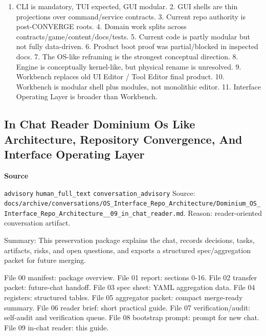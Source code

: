 \documentclass[9pt,a4paper,openany]{book}
\newcommand{\vonecallout}[3]{\par\medskip\noindent\begingroup\setlength{\fboxsep}{7pt}\colorbox{DomCalloutBg}{\parbox{0.94\linewidth}{\textbf{\textcolor{#1}{#2}}\par #3}}\endgroup\par\medskip}
\begin{document}
\begin{enumerate}
\item CLI is mandatory, TUI expected, GUI modular.\allowbreak{} 2.\allowbreak{} GUI shells are thin projections over command/\allowbreak{}service contracts.\allowbreak{} 3.\allowbreak{} Current repo authority is post-\allowbreak{}CONVERGE roots.\allowbreak{} 4.\allowbreak{} Domain work splits across contracts/\allowbreak{}game/\allowbreak{}content/\allowbreak{}docs/\allowbreak{}tests.\allowbreak{} 5.\allowbreak{} Current code is partly modular but not fully data-\allowbreak{}driven.\allowbreak{} 6.\allowbreak{} Product boot proof was partial/\allowbreak{}blocked in inspected docs.\allowbreak{} 7.\allowbreak{} The OS-\allowbreak{}like reframing is the strongest conceptual direction.\allowbreak{} 8.\allowbreak{} Engine is conceptually kernel-\allowbreak{}like, but physical rename is unresolved.\allowbreak{} 9.\allowbreak{} Workbench replaces old UI Editor /\allowbreak{} Tool Editor final product.\allowbreak{} 10.\allowbreak{} Workbench is modular shell plus modules, not monolithic editor.\allowbreak{} 11.\allowbreak{} Interface Operating Layer is broader than Workbench.\allowbreak{}
\end{enumerate}


\subsection{In Chat Reader Dominium Os Like Architecture, Repository Convergence, And Interface Operating Layer}

\vonecallout{DomSlate}{Source}{\texttt{advisory} \texttt{human\_\allowbreak{}full\_\allowbreak{}text} \texttt{conversation\_\allowbreak{}advisory} Source: \texttt{docs/\allowbreak{}archive/\allowbreak{}conversations/\allowbreak{}OS\_\allowbreak{}Interface\_\allowbreak{}Repo\_\allowbreak{}Architecture/\allowbreak{}Dominium\_\allowbreak{}OS\_\allowbreak{}Interface\_\allowbreak{}Repo\_\allowbreak{}Architecture\_\allowbreak{}\_\allowbreak{}09\_\allowbreak{}in\_\allowbreak{}chat\_\allowbreak{}reader.\allowbreak{}md}.\allowbreak{} Reason: reader-\allowbreak{}oriented conversation artifact.\allowbreak{}}

Summary: This preservation package explains the chat, records decisions, tasks, artifacts, risks, and open questions, and exports a structured spec/\allowbreak{}aggregation packet for future merging.\allowbreak{}


File 00 manifest: package overview.\allowbreak{} File 01 report: sections 0-\allowbreak{}16.\allowbreak{} File 02 transfer packet: future-\allowbreak{}chat handoff.\allowbreak{} File 03 spec sheet: YAML aggregation data.\allowbreak{} File 04 registers: structured tables.\allowbreak{} File 05 aggregator packet: compact merge-\allowbreak{}ready summary.\allowbreak{} File 06 reader brief: short practical guide.\allowbreak{} File 07 verification/\allowbreak{}audit: self-\allowbreak{}audit and verification queue.\allowbreak{} File 08 bootstrap prompt: prompt for new chat.\allowbreak{} File 09 in-\allowbreak{}chat reader: this guide.\allowbreak{}
\end{document}
